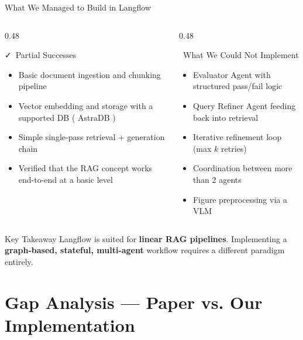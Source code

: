\documentclass[aspectratio=169]{beamer}
\begin{document}
\begin{frame}{What We Managed to Build in Langflow}
  \begin{columns}[T]
    \begin{column}{0.48\textwidth}
      \begin{exampleblock}{\faCheck\ Partial Successes}
        \small
        \begin{itemize}
          \item Basic document ingestion and chunking pipeline
          \item Vector embedding and storage with a supported DB ( AstraDB )
          \item Simple single-pass retrieval + generation chain
          \item Verified that the RAG concept works end-to-end at a basic level
        \end{itemize}
      \end{exampleblock}
    \end{column}
    \begin{column}{0.48\textwidth}
      \begin{alertblock}{\faTimes\ What We Could Not Implement}
        \small
        \begin{itemize}
          \item Evaluator Agent with structured pass/fail logic
          \item Query Refiner Agent feeding back into retrieval
          \item Iterative refinement loop (max $k$ retries)
          \item Coordination between more than 2 agents
          \item Figure preprocessing via a VLM
        \end{itemize}
      \end{alertblock}
    \end{column}
  \end{columns}
  \vspace{0.4cm}
  \begin{block}{Key Takeaway}
    \centering\small
    Langflow is suited for \textbf{linear RAG pipelines}. Implementing a \textbf{graph-based, stateful, multi-agent} workflow requires a different paradigm entirely.
  \end{block}
\end{frame}

\section{Gap Analysis — Paper vs. Our Implementation}
\end{document}
